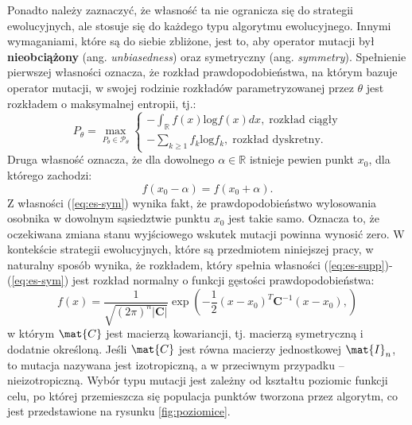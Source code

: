     Ponadto należy zaznaczyć, że własność ta nie ogranicza się do strategii ewolucyjnych, ale stosuje się do każdego typu algorytmu ewolucyjnego. Innymi wymaganiami, które są do siebie zbliżone, jest to, aby operator mutacji był \textbf{nieobciążony} (ang. \textit{unbiasedness}) oraz symetryczny (ang. \textit{symmetry}). Spełnienie pierwszej własności oznacza, że rozkład prawdopodobieństwa, na którym bazuje operator mutacji, w swojej rodzinie rozkładów parametryzowanej przez $\theta$ jest rozkładem o maksymalnej entropii, tj.:
    \begin{equation}
        \label{eq:es-entropy}
        P_{\theta} = \max_{P_\theta \in \mathcal{P}_{\theta}}
            \begin{cases}
                -\int_{\mathbb{R}}{f(x)\text{log}f(x)dx},\; \mbox{rozkład ciągły} \\
                -\sum_{k \geq 1} f_{k} \text{log}f_k,\; \mbox{rozkład dyskretny}.
            \end{cases}
    \end{equation}
    Druga własność oznacza, że dla dowolnego $\alpha \in \mathbb{R}$ istnieje pewien punkt $x_0$, dla którego zachodzi:
    \begin{equation}
        \label{eq:es-sym}
        f(x_0 - \alpha) = f(x_0 + \alpha).
    \end{equation}
    Z własności (\ref{eq:es-sym}) wynika fakt, że prawdopodobieństwo wylosowania osobnika w dowolnym sąsiedztwie punktu $x_0$ jest takie samo. Oznacza to, że oczekiwana zmiana stanu wyjściowego wskutek mutacji powinna wynosić zero. 
    W kontekście strategii ewolucyjnych, które są przedmiotem niniejszej pracy, w naturalny sposób wynika, że rozkładem, który spełnia własności (\ref{eq:es-supp})-(\ref{eq:es-sym}) jest rozkład normalny o funkcji gęstości prawdopodobieństwa:
    \begin{equation*}
        f(x)=\frac{1}{\sqrt{(2\pi)^n|\boldsymbol C|}}
            \exp
            \left(
                -\frac{1}{2}({x}-{x_0})^T{\boldsymbol C}^{-1}({x}-{x_0}),
            \right)
    \end{equation*}
    w którym $\mat{C}$ jest macierzą kowariancji, tj. macierzą symetryczną i dodatnie określoną. Jeśli $\mat{C}$ jest równa macierzy jednostkowej $\mat{I}_n$, to mutacja nazywana jest izotropiczną, a w przeciwnym przypadku -- nieizotropiczną. Wybór typu mutacji jest zależny od kształtu poziomic funkcji celu, po której przemieszcza się populacja punktów tworzona przez algorytm, co jest przedstawione na rysunku \ref{fig:poziomice}.
